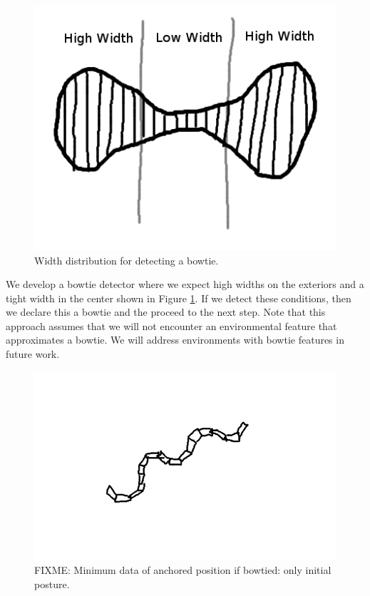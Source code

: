\begin{figure}
  \begin{center}
    \includegraphics[scale=0.6]{4_bowtie_detect.png}
  \end{center}
  \caption{Width distribution for detecting a bowtie.}
	\label{bowtie}
\end{figure}

We develop a bowtie detector where we expect high widths on the exteriors and a tight width in the center shown in Figure \ref{bowtie}.  If we detect these conditions, then we declare this a bowtie and the proceed to the next step.  Note that this approach assumes that we will not encounter an environmental feature that approximates a bowtie.  We will address environments with bowtie features in future work.

\begin{figure}
  \begin{center}
    \includegraphics[scale=0.5]{4_snapshot_1.png}
  \end{center}
  \caption{FIXME: Minimum data of anchored position if bowtied: only initial posture.}
	\label{snapshot2}
\end{figure}

